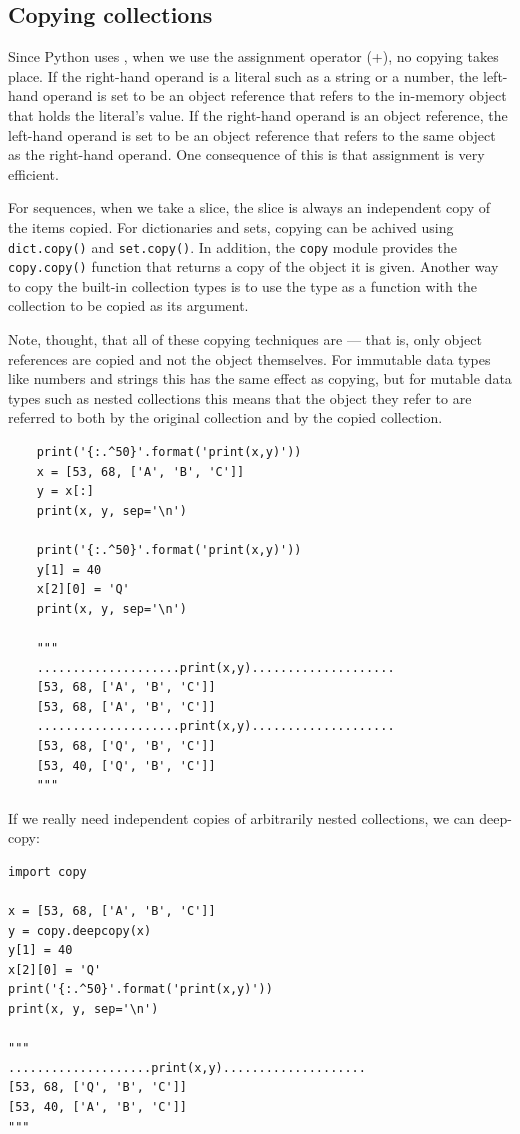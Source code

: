 \subsection{Copying collections}

Since Python uses , when we use the assignment operator (+), no copying takes place.
If the right-hand operand is a literal such as a string or a number, the left-hand operand is set to be an object reference that refers to the in-memory object that holds the literal’s value.
If the right-hand operand is an object reference, the left-hand operand is set to be an object reference that refers to the same object as the right-hand operand.
One consequence of this is that assignment is very efficient.



For sequences, when we take a slice, the slice is always an independent copy of the items copied.
For dictionaries and sets, copying can be achived using \verb|dict.copy()| and \verb|set.copy()|.
In addition, the \verb|copy| module provides the \verb|copy.copy()| function that returns a copy of the object it is given.
Another way to copy the built-in collection types is to use the type as a function with the collection to be copied as its argument.




\begin{tcolorbox}
  Note, thought, that all of these copying techniques are  --- that is, only object references are copied and not the object themselves.
  For immutable data types like numbers and strings this has the same effect as copying, but for mutable data types such as nested collections this means that the object they refer to are referred to both by the original collection and by the copied collection.


  \begin{lstlisting}
    print('{:.^50}'.format('print(x,y)'))
    x = [53, 68, ['A', 'B', 'C']]
    y = x[:]
    print(x, y, sep='\n')
    
    print('{:.^50}'.format('print(x,y)'))
    y[1] = 40
    x[2][0] = 'Q'
    print(x, y, sep='\n')

    """
    ....................print(x,y)....................
    [53, 68, ['A', 'B', 'C']]
    [53, 68, ['A', 'B', 'C']]
    ....................print(x,y)....................
    [53, 68, ['Q', 'B', 'C']]
    [53, 40, ['Q', 'B', 'C']]
    """
  \end{lstlisting}
\end{tcolorbox}



If we really need independent copies of arbitrarily nested collections, we can deep-copy:
\begin{lstlisting}
import copy

x = [53, 68, ['A', 'B', 'C']]
y = copy.deepcopy(x)
y[1] = 40
x[2][0] = 'Q'
print('{:.^50}'.format('print(x,y)'))
print(x, y, sep='\n')

"""
....................print(x,y)....................
[53, 68, ['Q', 'B', 'C']]
[53, 40, ['A', 'B', 'C']]
"""
\end{lstlisting}





